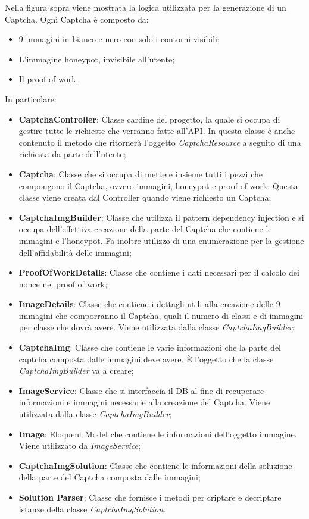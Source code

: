 Nella figura sopra viene mostrata la logica utilizzata per la generazione di un  Captcha.
Ogni Captcha è composto da:
 \begin{itemize}
     \item 9 immagini in bianco e nero con solo i contorni visibili;
     \item L'immagine honeypot, invisibile all'utente;
     \item Il proof of work.
 \end{itemize}


In particolare:
\begin{itemize}
    \item \textbf{CaptchaController}: Classe cardine del progetto, la quale si occupa di gestire tutte le richieste che verranno fatte all'API. In questa classe è anche contenuto il metodo che ritornerà l'oggetto \textit{CaptchaResource} a seguito di una richiesta da parte dell'utente;
    \item \textbf{Captcha}: Classe che si occupa di mettere insieme tutti i pezzi che compongono il Captcha, ovvero immagini, honeypot e proof of work. Questa classe viene creata dal Controller quando viene richiesto un Captcha;
    \item \textbf{CaptchaImgBuilder}: Classe che utilizza il pattern dependency injection e si occupa dell'effettiva creazione della parte del Captcha che contiene le immagini e l'honeypot. Fa inoltre utilizzo di una enumerazione per la gestione dell'affidabilità delle immagini;
    \item \textbf{ProofOfWorkDetails}: Classe che contiene i dati necessari per il calcolo dei nonce nel proof of work;
    \item \textbf{ImageDetails}: Classe che contiene i dettagli utili alla creazione delle 9 immagini che comporranno il Captcha, quali il numero di classi e di immagini per classe che dovrà avere. Viene utilizzata dalla classe \textit{CaptchaImgBuilder};
    \item \textbf{CaptchaImg}: Classe che contiene le varie informazioni che la parte del captcha composta dalle immagini deve avere. È l'oggetto che la classe \textit{CaptchaImgBuilder} va a creare;
    \item \textbf{ImageService}: Classe che si interfaccia il DB al fine di recuperare informazioni e immagini necessarie alla creazione del Captcha. Viene utilizzata dalla classe \textit{CaptchaImgBuilder};
    \item \textbf{Image}: Eloquent Model che contiene le informazioni dell'oggetto immagine. Viene utilizzato da \textit{ImageService};
    \item \textbf{CaptchaImgSolution}: Classe che contiene le informazioni della soluzione della parte del Captcha composta dalle immagini;
    \item \textbf{Solution Parser}: Classe che fornisce i metodi per criptare e decriptare istanze della classe \textit{CaptchaImgSolution}.
\end{itemize}

